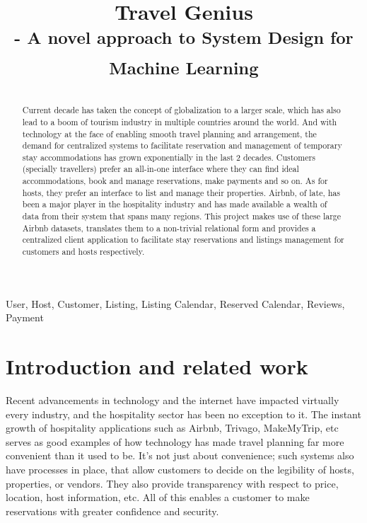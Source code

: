 \documentclass[conference]{IEEEtran}
\begin{document}
\title{
    Travel Genius\\
    { \textsuperscript{- A novel approach to System Design for Machine Learning}}
}

\author{
\and
{}
}

\maketitle


\vspace{-20mm}

\begin{abstract}
    Current decade has taken the concept of globalization to a larger scale, which has also lead to a boom of tourism industry in multiple countries around the world. And with technology at the face of enabling smooth travel planning and arrangement, the demand for centralized systems to facilitate reservation and management of temporary stay accommodations has grown exponentially in the last 2 decades. Customers (specially travellers) prefer an all-in-one interface where they can find ideal accommodations, book and manage reservations, make payments and so on. As for hosts, they prefer an interface to list and manage their properties.  Airbnb, of late, has been a major player in the hospitality industry and has made available a wealth of data from their system that spans many regions. This project makes use of these large Airbnb datasets, translates them to a non-trivial relational form and provides a centralized client application to facilitate stay reservations and listings management for customers and hosts respectively.
\end{abstract}

\begin{IEEEkeywords}
    User, Host, Customer, Listing, Listing Calendar, Reserved Calendar, Reviews, Payment
\end{IEEEkeywords}

\section{\textbf{Introduction and related work}}
    Recent advancements in technology and the internet have impacted virtually every industry, and the hospitality sector has been no exception to it. The instant growth of hospitality applications such as Airbnb, Trivago, MakeMyTrip, etc serves as good examples of how technology has made travel planning far more convenient than it used to be. It’s not just about convenience; such systems also have processes in place, that allow customers to decide on the legibility of hosts, properties, or vendors. They also provide transparency with respect to price, location, host information, etc. All of this enables a customer to make reservations with greater confidence and security.
\end{document}
